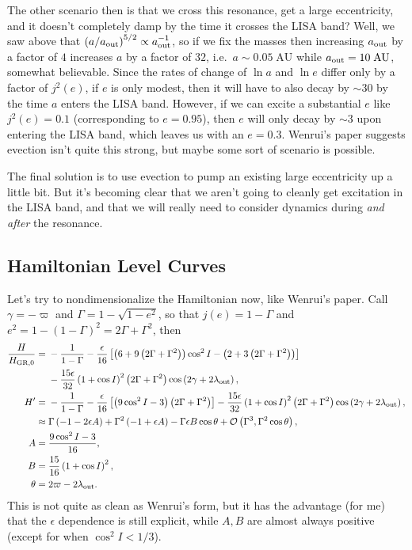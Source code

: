 \documentclass[11pt,
        usenames, %
        dvipsnames %
    ]{article}
\newcommand*{\p}[1]{\left(#1\right)}
\newcommand*{\s}[1]{\left[#1\right]}
\begin{document}
The other scenario then is that we cross this resonance, get a large
eccentricity, and it doesn't completely damp by the time it crosses the LISA
band? Well, we saw above that $\p{a / a_{\rm out}}^{5/2} \propto a_{\rm
out}^{-1}$, so if we fix the masses then increasing $a_{\rm out}$ by a factor of
$4$ increases $a$ by a factor of $32$, i.e.\ $a \sim 0.05\;\mathrm{AU}$ while
$a_{\rm out} = 10\;\mathrm{AU}$, somewhat believable. Since the rates of change
of $\ln a$ and $\ln e$ differ only by a factor of $j^2(e)$, if $e$ is only
modest, then it will have to also decay by $\sim 30$ by the time $a$ enters the
LISA band. However, if we can excite a substantial $e$ like $j^2(e) = 0.1$
(corresponding to $e = 0.95$), then $e$ will only decay by $\sim 3$ upon
entering the LISA band, which leaves us with an $e = 0.3$. Wenrui's paper
suggests evection isn't quite this strong, but maybe some sort of scenario is
possible.

The final solution is to use evection to pump an existing large eccentricity up
a little bit. But it's becoming clear that we aren't going to cleanly get
excitation in the LISA band, and that we will really need to consider dynamics
during \emph{and after} the resonance.

\subsection{Hamiltonian Level Curves}

Let's try to nondimensionalize the Hamiltonian now, like Wenrui's paper. Call
$\gamma = -\varpi$ and $\Gamma = 1 - \sqrt{1 - e^2}$, so that $j(e) = 1 -
\Gamma$ and $e^2 = 1 - \p{1 - \Gamma}^2 = 2\Gamma + \Gamma^2$, then
\begin{align}
    \frac{H}{H_{\rm GR, 0}} ={}&
        -\frac{1}{1 - \Gamma} - \frac{\epsilon}{16}
            \s{\p{6 + 9\p{2\Gamma + \Gamma^2}}\cos^2 I
                - \p{2 + 3\p{2\Gamma + \Gamma^2}}}\nonumber\\
            &- \frac{15\epsilon}{32}\p{1 + \cos I}^2 \p{2\Gamma + \Gamma^2}
                \cos\p{2\gamma + 2\lambda_{\rm out}},\\
    H' ={}& -\frac{1}{1 - \Gamma} - \frac{\epsilon}{16}\s{
        \p{9\cos^2 I - 3}\p{2\Gamma + \Gamma^2}}
        - \frac{15\epsilon}{32}\p{1 + \cos I}^2
            \p{2\Gamma + \Gamma^2}\cos\p{2\gamma + 2\lambda_{\rm out}},\\
        \approx{}&
            \Gamma\p{-1 - 2\epsilon A}
            + \Gamma^2\p{-1 + \epsilon A}
            - \Gamma \epsilon B\cos \theta
            + \mathcal{O}\p{\Gamma^3, \Gamma^2 \cos \theta},\\
    A ={}& \frac{9\cos^2 I - 3}{16},\\
    B ={}& \frac{15}{16}\p{1 + \cos I}^2,\\
    \theta ={}& 2\varpi - 2\lambda_{\rm out}.
\end{align}
This is not quite as clean as Wenrui's form, but it has the advantage (for me)
that the $\epsilon$ dependence is still explicit, while $A, B$ are almost always
positive (except for when $\cos^2 I < 1/3$).
\end{document}
